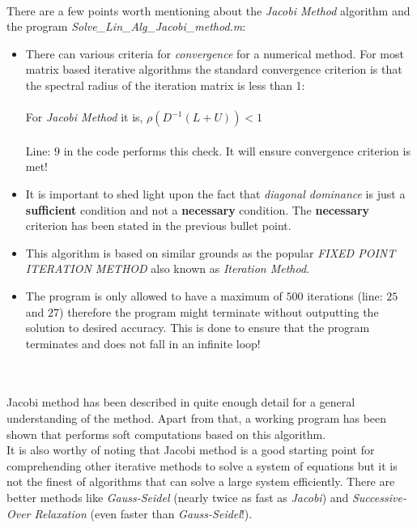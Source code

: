 \documentclass[main]{subfiles}
\begin{document}
    
     \\

    There are a few points worth mentioning about the \textit{Jacobi Method} algorithm and the program 
    \textit{Solve\_Lin\_Alg\_Jacobi\_method.m}:
    \\
    \begin{itemize}
        
        \item There can various criteria for \textit{convergence} for a numerical method. 
        For most matrix based iterative algorithms the standard convergence criterion is that the spectral radius of the iteration 
        matrix is less than 1:\\\\
        For \textit{Jacobi Method} it is,   
        $\rho \left( D^{-1} \left( L + U \right) \right) < 1$
        \\\\
        Line: {\small $9$} in the code performs this check. It will ensure convergence criterion is met! 


        \item It is important to shed light upon the fact that \textit{diagonal dominance} is just a 
        \textbf{sufficient} condition and not a \textbf{necessary} condition. The \textbf{necessary} criterion 
        has been stated in the previous bullet point.

        \item This algorithm is based on similar grounds as the popular \textit{FIXED POINT ITERATION METHOD} 
        also known as \textit{Iteration Method}.

        \item The program is only allowed to have a maximum of $500$ iterations (line: $25$ and $27$) therefore the program might terminate without 
        outputting the solution to desired accuracy. This is done to ensure that the program terminates and does not fall in an infinite loop!
    \\

    \end{itemize}
    
     \\\\
    Jacobi method has been described in quite enough detail for a general understanding of the method. Apart from that, a working program has been shown that performs soft computations 
    based on this algorithm. \\
    It is also worthy of noting that Jacobi method is a good starting point for comprehending other iterative methods to solve a system of equations but it is not the finest 
        of algorithms that can solve a large system efficiently. There are better methods like \textit{Gauss-Seidel} (nearly twice as fast as \textit{Jacobi}) and \textit{Successive-Over Relaxation} (even faster than \textit{Gauss-Seidel}!). 
    
\end{document}
